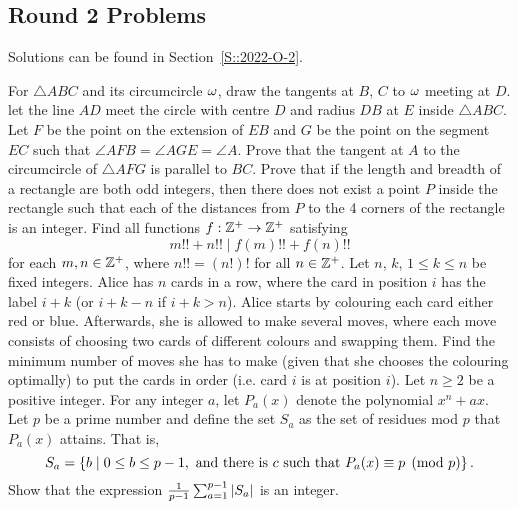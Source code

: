 \subsection{Round 2 Problems}

Solutions can be found in Section~\ref{S::2022-O-2}.

\begin{enumerate}
    \hyperrefitem[A::2022-O-2-1] For $\triangle ABC$ and its circumcircle $\omega$, draw the tangents at $B$, $C$ to $\omega$ meeting at $D$. let the line $AD$ meet the circle with centre $D$ and radius $DB$ at $E$ inside $\triangle ABC$. Let $F$ be the point on the extension of $EB$ and $G$ be the point on the segment $EC$ such that $\angle AFB = \angle AGE = \angle A$. Prove that the tangent at $A$ to the circumcircle of $\triangle AFG$ is parallel to $BC$.
    \hyperrefitem[A::2022-O-2-2] Prove that if the length and breadth of a rectangle are both odd integers, then there does not exist a point $P$ inside the rectangle such that each of the distances from $P$ to the 4 corners of the rectangle is an integer.
    \hyperrefitem[A::2022-O-2-3] Find all functions $f : \mathbb{Z}^+ \to \mathbb{Z}^+$ satisfying \[m!! + n!! \mid f(m)!! + f(n)!!\] for each $m, n \in \mathbb{Z}^+$, where $n!! = (n!)!$ for all $n \in \mathbb{Z}^+$.
    \hyperrefitem[A::2022-O-2-4] Let $n$, $k$, $1 \leq k \leq n$ be fixed integers. Alice has $n$ cards in a row, where the card in position $i$ has the label $i + k$ (or $i + k - n$ if $i + k > n$). Alice starts by colouring each card either red or blue. Afterwards, she is allowed to make several moves, where each move consists of choosing two cards of different colours and swapping them. Find the minimum number of moves she has to make (given that she chooses the colouring optimally) to put the cards in order (i.e. card $i$ is at position $i$).
    \hyperrefitem[A::2022-O-2-5] Let $n \geq 2$ be a positive integer. For any integer $a$, let $P_a(x)$ denote the polynomial $x^n + ax$. Let $p$ be a prime number and define the set $S_a$ as the set of residues mod $p$ that $P_a(x)$ attains. That is, \[S_a = \left\lbrace b \mid 0 \leq b \leq p -1, \text{ and there is $c$ such that $P_a(x) \equiv p \pmod{p}$} \right\rbrace.\] Show that the expression $\frac1{p-1} \sum_{a=1}^{p-1} \left\lvert S_a \right\rvert$ is an integer.
\end{enumerate}

